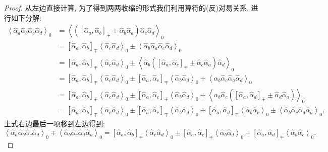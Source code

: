 \begin{proof}
从左边直接计算, 为了得到两两收缩的形式我们利用算符的(反)对易关系, 进行如下分解:
\begin{align}
\left\langle\hat{\alpha}_a \hat{\alpha}_b \hat{\alpha}_c \hat{\alpha}_d\right\rangle_0 & =\left\langle\left(\left[\hat{\alpha}_a, \hat{\alpha}_b\right]_{\mp} \pm \hat{\alpha}_b \hat{\alpha}_a\right) \hat{\alpha}_c \hat{\alpha}_d\right\rangle_0 \nonumber\\
& =\left[\hat{\alpha}_a, \hat{\alpha}_b\right]_{\mp}\left\langle\hat{\alpha}_c \hat{\alpha}_d\right\rangle_0 \pm\left\langle\hat{\alpha}_b \hat{\alpha}_a \hat{\alpha}_c \hat{\alpha}_d\right\rangle_0 \nonumber\\
& =\left[\hat{\alpha}_a, \hat{\alpha}_b\right]_{\mp}\left\langle\hat{\alpha}_c \hat{\alpha}_d\right\rangle_0 \pm\left\langle\hat{\alpha}_b\left(\left[\hat{\alpha}_a ,\hat{\alpha}_c\right]_{\mp} \pm \hat{\alpha}_c \hat{\alpha}_a\right) \hat{\alpha}_d\right\rangle_0 \nonumber\\
& =\left[\hat{\alpha}_a, \hat{\alpha}_b\right]_{\mp}\left\langle\hat{\alpha}_c \hat{\alpha}_d\right\rangle_0 \pm\left[\hat{\alpha}_a, \hat{\alpha}_c\right]_{\mp}\left\langle\hat{\alpha}_b \hat{\alpha}_d\right\rangle_0+\left\langle\hat{\alpha}_b \hat{\alpha}_c \hat{\alpha}_a \hat{\alpha}_d\right\rangle_0\nonumber \\
& =\left[\hat{\alpha}_a, \hat{\alpha}_b\right]_{\mp}\left\langle\hat{\alpha}_c \hat{\alpha}_d\right\rangle_0 \pm\left[\hat{\alpha}_a, \hat{\alpha}_c\right]_{\mp}\left\langle\hat{\alpha}_b \hat{\alpha}_d\right\rangle_0+\left\langle\hat{\alpha}_b \hat{\alpha}_c\left(\left[\hat{\alpha}_a, \hat{\alpha}_d\right]_{\mp} \pm \hat{\alpha}_d \hat{\alpha}_a\right)\right\rangle_0 \nonumber\\
& =\left[\hat{\alpha}_a, \hat{\alpha}_b\right]_{\mp}\left\langle\hat{\alpha}_c \hat{\alpha}_d\right\rangle_0 \pm\left[\hat{\alpha}_a, \hat{\alpha}_c\right]_{\mp}\left\langle\hat{\alpha}_b \hat{\alpha}_d\right\rangle_0+\left[\hat{\alpha}_a, \hat{\alpha}_d\right]_{\mp}\left\langle\hat{\alpha}_b \hat{\alpha}_c\right\rangle_0 \pm\left\langle\hat{\alpha}_b \hat{\alpha}_c \hat{\alpha}_d \hat{\alpha}_a\right\rangle_0,
\end{align}
上式右边最后一项移到左边得到:
\begin{equation}\label{cs}
\left\langle\hat{\alpha}_a \hat{\alpha}_b \hat{\alpha}_c \hat{\alpha}_d\right\rangle_0 \mp\left\langle\hat{\alpha}_b \hat{\alpha}_c \hat{\alpha}_d \hat{\alpha}_a\right\rangle_0=\left[\hat{\alpha}_a, \hat{\alpha}_b\right]_{\mp}\left\langle\hat{\alpha}_c \hat{\alpha}_d\right\rangle_0 \pm\left[\hat{\alpha}_a, \hat{\alpha}_c\right]_{\mp}\left\langle\hat{\alpha}_b \hat{\alpha}_d\right\rangle_0+\left[\hat{\alpha}_a, \hat{\alpha}_d\right]_{\mp}\left\langle\hat{\alpha}_b \hat{\alpha}_c\right\rangle_0.

\end{equation}
\end{proof}
